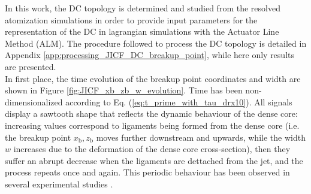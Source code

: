 In this work, the DC topology is determined and studied from the resolved atomization simulations in order to provide input parameters for the representation of the DC in lagrangian simulations with the Actuator Line Method (ALM). The procedure followed to process the DC topology is detailed in Appendix \ref{app:processing_JICF_DC_breakup_point}, while here only results are presented. \\



In first place, the time evolution of the breakup point coordinates and width are shown in Figure \ref{fig:JICF_xb_zb_w_evolution}. Time has been non-dimensionalized according to Eq. (\ref{eq:t_prime_with_tau_drx10}). All signals display a sawtooth shape that reflects the dynamic behaviour of the dense core: increasing values correspond to ligaments being formed from the dense core (i.e. the breakup point $x_\mathrm{b}, z_\mathrm{b}$ moves further downstream and upwards, while the width $w$ increases due to the deformation of the dense core cross-section), then they suffer an abrupt decrease when the ligaments are dettached from the jet, and the process repeats once and again.  This periodic behaviour has been observed in several experimental studies  .




